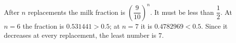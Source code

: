 After $n$ replacements the milk fraction is $(\dfrac{9}{10})^n$. It must be less than $\dfrac{1}{2}$. At $n=6$ the fraction is $0.531441>0.5$; at $n=7$ it is $0.4782969<0.5$. Since it decreases at every replacement, the least number is $\boxed{7}$.
